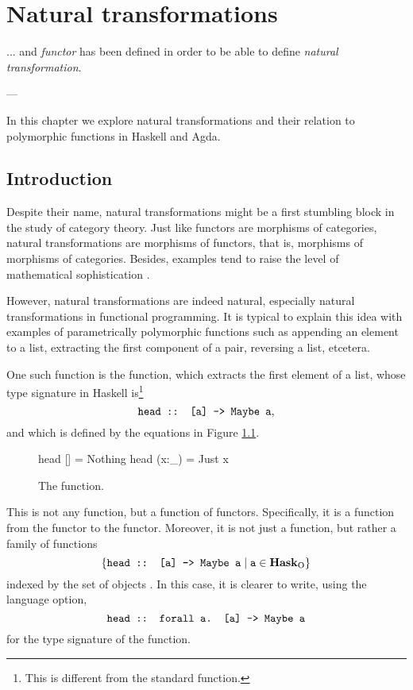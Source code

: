 \chapter{Natural transformations}
\label{chap:naturals}

\epigraph{
  ... and \emph{functor} has been defined in order to be able to
  define \emph{natural transformation}.
}{---\textcite[18]{maclane-1998}}

In this chapter we explore natural transformations and their relation
to polymorphic functions in Haskell and Agda.

\section{Introduction}
\label{sec:naturals-introduction}

Despite their name, natural transformations might be a first stumbling
block in the study of category theory. Just like functors are
morphisms of categories, natural transformations are morphisms of
functors, that is, morphisms of morphisms of categories. Besides,
examples tend to raise the level of mathematical sophistication
\parencites[433]{poigne-1992}[page 47]{rydeheard-1988}.

However, natural transformations are indeed natural, especially
natural transformations in functional programming. It is typical to
explain this idea with examples of parametrically polymorphic
functions such as appending an element to a list, extracting the first
component of a pair, reversing a list, etcetera.

One such function is the  function, which extracts
the first element of a list, whose type signature in Haskell
is\footnote{This is different from the standard 
  function.}
\begin{equation*}
  \text{\texttt{head :: [a] -> Maybe a}}
  \text{,}
\end{equation*}
and which is defined by the equations in Figure \ref{fig:head}.
\begin{figure}[htb]
  \begin{codehaskell}
                        head []    = Nothing
                        head (x:_) = Just x
  \end{codehaskell}
  \caption{The  function.}
  \label{fig:head}
\end{figure}
This is not any function, but a function of functors. Specifically, it
is a function from the \texthaskell{[]} functor to the
 functor. Moreover, it is not just a function, but
rather a family of functions
\begin{equation*}
  \{
  \text{\texttt{head :: [a] -> Maybe a}}
    \mid \text{\texttt{a}} \in \mathcal{\mathbf{Hask}}_{\operatorname{O}}
  \}
\end{equation*}
indexed by the set of objects \catO{\hask}. In this case, it is
clearer to write, using the  language
option,
\begin{equation*}
  \text{\texttt{head :: forall a. [a] -> Maybe a}}
\end{equation*}
for the type signature of the function.

